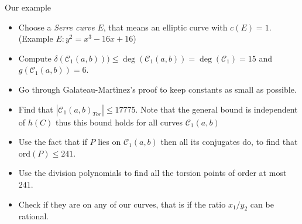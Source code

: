 \documentclass[12pt]{beamer}
\begin{document}
\begin{frame}{Our example}
\begin{itemize}
\item Choose a \textit{Serre curve} $E$, that means an elliptic curve with $c(E)=1$. (Example $E \colon y^2  = x^3 - 16 x + 16 $) \pause
\item Compute $\delta(\mathcal{C}_1(a,b)))\le 
	\deg(\mathcal{C}_1(a,b)) = \deg(\mathcal{C}_1) = 15$ and $g(\mathcal{C}_1(a,b)) = 6$.\pause
\item Go through Galateau-Mart\`inez's proof to keep constants as small as possible.\pause
\item Find that $|\mathcal{C}_1(a,b)_{Tor}|\le 17775$. \newline \indent\hspace{0.5cm} Note that the general bound is independent of $h(C)$ thus this bound holds for all  curves $\mathcal{C}_1(a,b)$\pause
\item Use the fact that if $P$ lies on $\mathcal{C}_1(a,b)$ then all its conjugates do, to find that $\mathrm{ord}(P)\le 241$. \pause
\item Use the division polynomials to find all the torsion points of order at most $241$.\pause
\item Check if they are on any of our curves, that is if the ratio $x_1/y_2$ can be rational. 
 \end{itemize}

\end{frame}
\end{document}
